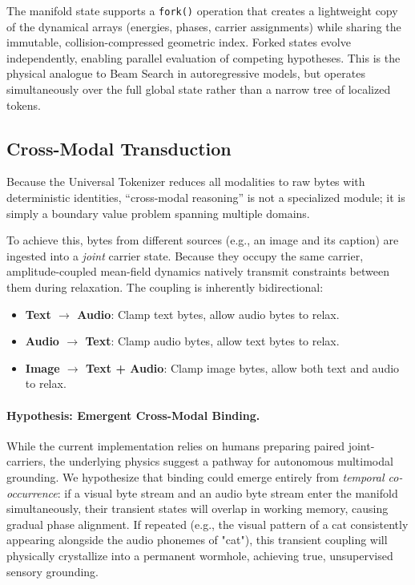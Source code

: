 \documentclass[11pt,a4paper]{article}
\begin{document}
The manifold state supports a \texttt{fork()} operation that creates a lightweight copy of the dynamical arrays (energies, phases, carrier assignments) while sharing the immutable, collision-compressed geometric index. Forked states evolve independently, enabling parallel evaluation of competing hypotheses. This is the physical analogue to Beam Search in autoregressive models, but operates simultaneously over the full global state rather than a narrow tree of localized tokens.

\subsection{Cross-Modal Transduction}
\label{sec:bridge}

Because the Universal Tokenizer reduces all modalities to raw bytes with deterministic identities, ``cross-modal reasoning'' is not a specialized module; it is simply a boundary value problem spanning multiple domains.

To achieve this, bytes from different sources (e.g., an image and its caption) are ingested into a \emph{joint} carrier state. Because they occupy the same carrier, amplitude-coupled mean-field dynamics natively transmit constraints between them during relaxation. The coupling is inherently bidirectional:
\begin{itemize}[nosep]
    \item \textbf{Text $\to$ Audio}: Clamp text bytes, allow audio bytes to relax.
    \item \textbf{Audio $\to$ Text}: Clamp audio bytes, allow text bytes to relax.
    \item \textbf{Image $\to$ Text + Audio}: Clamp image bytes, allow both text and audio to relax.
\end{itemize}

\paragraph{Hypothesis: Emergent Cross-Modal Binding.}
While the current implementation relies on humans preparing paired joint-carriers, the underlying physics suggest a pathway for autonomous multimodal grounding. We hypothesize that binding could emerge entirely from \emph{temporal co-occurrence}: if a visual byte stream and an audio byte stream enter the manifold simultaneously, their transient states will overlap in working memory, causing gradual phase alignment. If repeated (e.g., the visual pattern of a cat consistently appearing alongside the audio phonemes of "cat"), this transient coupling will physically crystallize into a permanent wormhole, achieving true, unsupervised sensory grounding.
\end{document}
